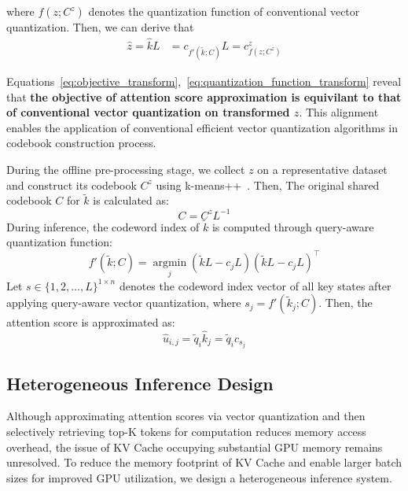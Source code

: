 where \(f(z; C^z)\) denotes the quantization function of conventional vector quantization.
Then, we can derive that
\begin{equation}
    \label{eq:quantization_function_transform}
    \begin{aligned}
        \hat z = \hat k L & = c_{f'(\tilde k; C)}L = c^z_{f(z; C^z)} 
    \end{aligned}
\end{equation}

Equations~\ref{eq:objective_transform},~\ref{eq:quantization_function_transform}
reveal that \textbf{the objective of attention score approximation is equivilant to that of conventional vector quantization on transformed \(z\)}.
This alignment enables the application of conventional efficient vector quantization algorithms in codebook construction process.

During the offline pre-processing stage, we collect \(z\) on a representative dataset and construct its codebook \(C^z\) using k-means++~\citep{kmeans++}.
Then, The original shared codebook \(C\) for \(\tilde k\) is calculated as:
\begin{equation}
    C = C^z L^{-1}
\end{equation}
During inference, the codeword index of \(\tilde k\) is computed through query-aware quantization function:
\begin{equation}
    f'(\tilde k; C) = \operatorname*{argmin}_j (\tilde k L - c_jL)(\tilde k L - c_jL)^\top
\end{equation}
Let \(s \in \{1, 2, \dots, L\}^{1 \times n}\) denotes the codeword index vector of all key states after applying query-aware vector quantization, where \(s_j = f'(\tilde k_j; C)\).
Then, the attention score is approximated as:
\begin{equation}
    \hat u_{i,j} = \tilde q_i \hat k_j = \tilde q_i c_{s_j}
\end{equation}

\subsection{Heterogeneous Inference Design}

Although approximating attention scores via vector quantization and then selectively retrieving top-K tokens for computation reduces memory access overhead, the issue of KV Cache occupying substantial GPU memory remains unresolved. 
To reduce the memory footprint of KV Cache and enable larger batch sizes for improved GPU utilization, we design a heterogeneous inference system. 

